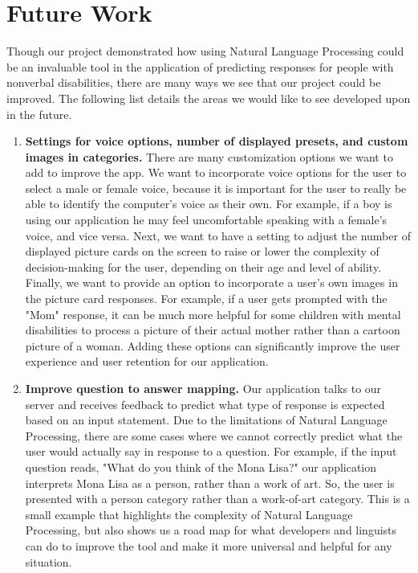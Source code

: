 \section{Future Work}
Though our project demonstrated how using Natural Language Processing could be an invaluable tool in the application of predicting responses for people with nonverbal disabilities, there are many ways we see that our project could be improved. The following list details the areas we would like to see developed upon in the future.
\begin{enumerate}
	\item \textbf{Settings for voice options, number of displayed presets, and custom images in categories.}  There are many customization options we want to add to improve the app. We want to incorporate voice options for the user to select a male or female voice, because it is important for the user to really be able to identify the computer's voice as their own. For example, if a boy is using our application he may feel uncomfortable speaking with a female's voice, and vice versa. Next, we want to have a setting to adjust the number of displayed picture cards on the screen to raise or lower the complexity of decision-making for the user, depending on their age and level of ability. Finally, we want to provide an option to incorporate a user's own images in the picture card responses. For example, if a user gets prompted with the "Mom" response, it can be much more helpful for some children with mental disabilities to process a picture of their actual mother rather than a cartoon picture of a woman. Adding these options can significantly improve the user experience and user retention for our application.
	\item \textbf{Improve question to answer mapping.} Our application talks to our server and receives feedback to predict what type of response is expected based on an input statement. Due to the limitations of Natural Language Processing, there are some cases where we cannot correctly predict what the user would actually say in response to a question. For example, if the input question reads, "What do you think of the Mona Lisa?" our application interprets Mona Lisa as a person, rather than a work of art. So, the user is presented with a person category rather than a work-of-art category. This is a small example that highlights the complexity of Natural Language Processing, but also shows us a road map for what developers and linguists can do to improve the tool and make it more universal and helpful for any situation.

\end{enumerate}
